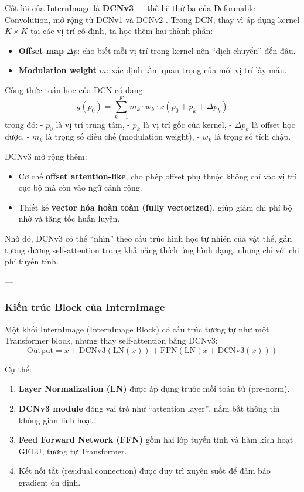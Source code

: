 Cốt lõi của InternImage là \textbf{DCNv3} — thế hệ thứ ba của Deformable Convolution, mở rộng từ DCNv1 \cite{Dai2017} và DCNv2 \cite{Zhu2019}.  
Trong DCN, thay vì áp dụng kernel $K \times K$ tại các vị trí cố định, ta học thêm hai thành phần:
\begin{itemize}
	\item \textbf{Offset map} $\Delta p$: cho biết mỗi vị trí trong kernel nên “dịch chuyển” đến đâu.
	\item \textbf{Modulation weight} $m$: xác định tầm quan trọng của mỗi vị trí lấy mẫu.
\end{itemize}

Công thức toán học của DCN có dạng:
\[
y(p_0) = \sum_{k=1}^{K} m_k \cdot w_k \cdot x(p_0 + p_k + \Delta p_k)
\]
trong đó:
- $p_0$ là vị trí trung tâm,
- $p_k$ là vị trí gốc của kernel,
- $\Delta p_k$ là offset học được,
- $m_k$ là trọng số điều chế (modulation weight),
- $w_k$ là trọng số tích chập.

DCNv3 mở rộng thêm:
\begin{itemize}
	\item Cơ chế \textbf{offset attention-like}, cho phép offset phụ thuộc không chỉ vào vị trí cục bộ mà còn vào ngữ cảnh rộng.
	\item Thiết kế \textbf{vector hóa hoàn toàn (fully vectorized)}, giúp giảm chi phí bộ nhớ và tăng tốc huấn luyện.
\end{itemize}

Nhờ đó, DCNv3 có thể “nhìn” theo cấu trúc hình học tự nhiên của vật thể, gần tương đương self-attention trong khả năng thích ứng hình dạng, nhưng chỉ với chi phí tuyến tính.

---

\subsubsection{Kiến trúc Block của InternImage}
\label{subsubsec:internimage_block}

Một khối InternImage (InternImage Block) có cấu trúc tương tự như một Transformer block, nhưng thay self-attention bằng DCNv3:
\[
\text{Output} = x + \text{DCNv3}(\text{LN}(x)) + \text{FFN}(\text{LN}(x + \text{DCNv3}(x)))
\]

Cụ thể:
\begin{enumerate}
	\item \textbf{Layer Normalization (LN)} được áp dụng trước mỗi toán tử (pre-norm).
	\item \textbf{DCNv3 module} đóng vai trò như “attention layer”, nắm bắt thông tin không gian linh hoạt.
	\item \textbf{Feed Forward Network (FFN)} gồm hai lớp tuyến tính và hàm kích hoạt GELU, tương tự Transformer.
	\item Kết nối tắt (residual connection) được duy trì xuyên suốt để đảm bảo gradient ổn định.
\end{enumerate}

